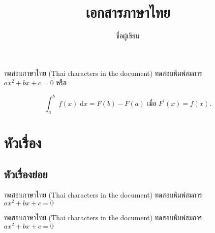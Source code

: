 \documentclass{article}
\title{เอกสารภาษาไทย}
\author{ชื่อผู้เขียน}
\begin{document}
\maketitle

ทดสอบภาษาไทย (Thai characters in the document) ทดสอบพิมพ์สมการ $ax^2+bx+c = 0$ หรือ 

\[
\int_a^b\; f(x) \;\mathrm{d}x = F(b) - F(a) \text{ เมื่อ } F^{\prime}(x) = f(x).
\]

\section{หัวเรื่อง}

\subsection{หัวเรื่องย่อย}

ทดสอบภาษาไทย (Thai characters in the document) ทดสอบพิมพ์สมการ $ax^2+bx+c = 0$

\begin{theorem}
ทดสอบภาษาไทย (Thai characters in the document) ทดสอบพิมพ์สมการ $ax^2+bx+c = 0$
\end{theorem}
\end{document}
